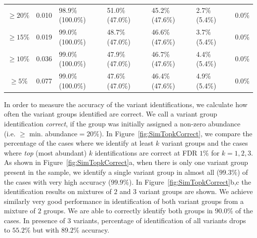 \begin{table}[h]
\begin{tabular}{|c|l|l|l|l|l|l|}
$\ge 20\%$ &0.010 &98.9\% (100.0\%) &51.0\% (47.0\%) &45.2\% (47.6\%) &2.7\% (5.4\%) &0.0\%\\
$\ge 15\%$ &0.019 &99.0\% (100.0\%) &48.7\% (47.0\%) &46.6\% (47.6\%) &3.7\% (5.4\%) &0.0\%\\
$\ge 10\%$ &0.036 &99.0\% (100.0\%) &47.9\% (47.0\%) &46.7\% (47.6\%) &4.4\% (5.4\%) &0.0\%\\
$\ge 5\%$ &0.077 &99.0\% (100.0\%) &47.6\% (47.0\%) &46.4\% (47.6\%) &4.9\% (5.4\%) &0.0\%\\
\hline
\end{tabular}
\end{table}

\clearpage
In order to measure the accuracy of the variant identifications, we calculate how often the variant groups identified are correct. We call a variant group identification \emph{correct}, if the group was initially assigned a non-zero abundance (i.e. $\ge$ min. abundance$=20\%$).
In Figure~\ref{fig:SimTopkCorrect}, we compare the percentage of the cases where we identify at least $k$ variant groups and the cases where \emph{top} (most abundant) $k$ identifications are correct at FDR $1\%$ for $k=1,2,3$. As shown in Figure~\ref{fig:SimTopkCorrect}a, when there is only one variant group present in the sample, we identify a single variant group in almost all ($99.3\%$) of the cases with very high accuracy ($99.9\%$). In Figure~\ref{fig:SimTopkCorrect}b,c the identification results on mixtures of $2$ and $3$ variant groups are shown. We achieve similarly very good performance in identification of both variant groups from a mixture of $2$ groups. We are able to correctly identify both groups in $90.0\%$ of the cases. In presence of $3$ variants, percentage of identification of all variants drops to $55.2\%$ but with $89.2\%$ accuracy.



